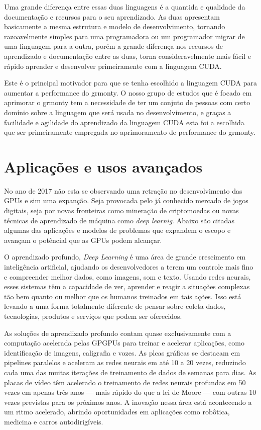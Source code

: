   Uma grande diferença entre essas duas linguagens é a quantida e qualidade da documentação e recursos para o seu aprendizado. As duas apresentam basicamente a mesma estrutura e modelo de desenvolvimento, tornando razoavelmente simples para uma programadora ou um programador migrar de uma linguagem para a outra, porém a grande diferença nos recursos de aprendizado e documentação entre as duas, torna consideravelmente mais fácil e rápido aprender e desenvolver primeiramente com a linguagem CUDA.

  Este é o principal motivador para que se tenha escolhido a linguagem CUDA para aumentar a performance do grmonty. O nosso grupo de estudos que é focado em aprimorar o grmonty tem a necessidade de ter um conjuto de pessoas com certo domínio sobre a linguagem que será usada no desenvolvimento, e graças a facilidade e agilidade do aprendizado da linguagem CUDA esta foi a escolhida que ser primeiramente empregada no aprimoramento de performance do grmonty.

\section{Aplicações e usos avançados}

  No ano de 2017 não esta se observando uma retração no desenvolvimento das GPUs e sim uma expanção. Seja provocada pelo já conhecido mercado de jogos digitais, seja por novas fronteiras como mineração de criptomoedas ou novas técnicas de aprendizado de máquina como \textit{deep learnig}. Abaixo são citadas algumas das aplicações e modelos de problemas que expandem o escopo e avançam o potêncial que as GPUs podem alcançar.

  O aprendizado profundo, \textit{Deep Learning} é uma área de grande crescimento em inteligência artificial, ajudando os desenvolvedores a terem um controle mais fino e compreender melhor dados, como imagens, som e texto. Usando redes neurais, esses sistemas têm a capacidade de ver, aprender e reagir a situações complexas tão bem quanto ou melhor que os humanos treinados em tais ações. Isso está levando a uma forma totalmente diferente de pensar sobre coleta dados, tecnologias, produtos e serviços que podem ser oferecidos.

  As soluções de aprendizado profundo contam quase exclusivamente com a computação acelerada pelas GPGPUs para treinar e acelerar aplicações, como identificação de imagens, caligrafia e vozes. As plcas gráficas se destacam em pipelines paralelos e aceleram as redes neurais em até 10 a 20 vezes, reduzindo cada uma das muitas iterações de treinamento de dados de semanas para dias. As placas de vídeo têm acelerado o treinamento de redes neurais profundas em 50 vezes em apenas três anos — mais rápido do que a lei de Moore — com outras 10 vezes previstas para os próximos anos. A inovação nessa área está acontecendo a um ritmo acelerado, abrindo oportunidades em aplicações como robôtica, medicina e carros autodirigíveis.


